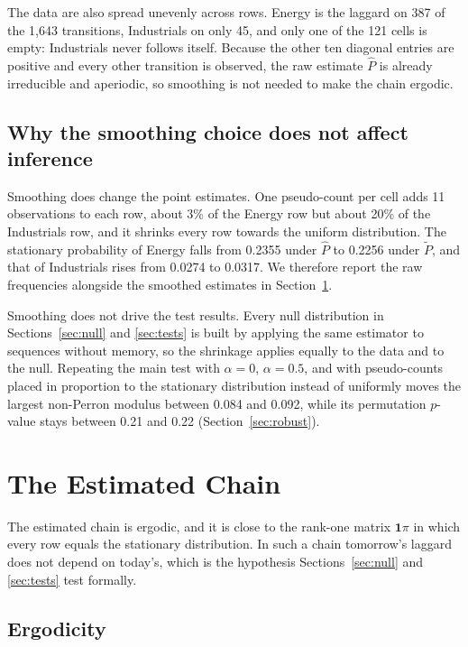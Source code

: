 \documentclass[11pt]{article}
\begin{document}
The data are also spread unevenly across rows. Energy is the laggard on 387 of the 1{,}643 transitions, Industrials on only 45, and only one of the 121 cells is empty: Industrials never follows itself. Because the other ten diagonal entries are positive and every other transition is observed, the raw estimate $\hat P$ is already irreducible and aperiodic, so smoothing is not needed to make the chain ergodic.

\subsection{Why the smoothing choice does not affect inference}

Smoothing does change the point estimates. One pseudo-count per cell adds 11 observations to each row, about 3\% of the Energy row but about 20\% of the Industrials row, and it shrinks every row towards the uniform distribution. The stationary probability of Energy falls from 0.2355 under $\hat P$ to 0.2256 under $\tilde P$, and that of Industrials rises from 0.0274 to 0.0317. We therefore report the raw frequencies alongside the smoothed estimates in Section~\ref{sec:chain}.

Smoothing does not drive the test results. Every null distribution in Sections~\ref{sec:null} and \ref{sec:tests} is built by applying the same estimator to sequences without memory, so the shrinkage applies equally to the data and to the null. Repeating the main test with $\alpha = 0$, $\alpha = 0.5$, and with pseudo-counts placed in proportion to the stationary distribution instead of uniformly moves the largest non-Perron modulus between 0.084 and 0.092, while its permutation $p$-value stays between 0.21 and 0.22 (Section~\ref{sec:robust}).

\clearpage
\section{The Estimated Chain}
\label{sec:chain}

The estimated chain is ergodic, and it is close to the rank-one matrix $\mathbf 1\pi$ in which every row equals the stationary distribution. In such a chain tomorrow's laggard does not depend on today's, which is the hypothesis Sections~\ref{sec:null} and \ref{sec:tests} test formally.

\subsection{Ergodicity}
\end{document}
